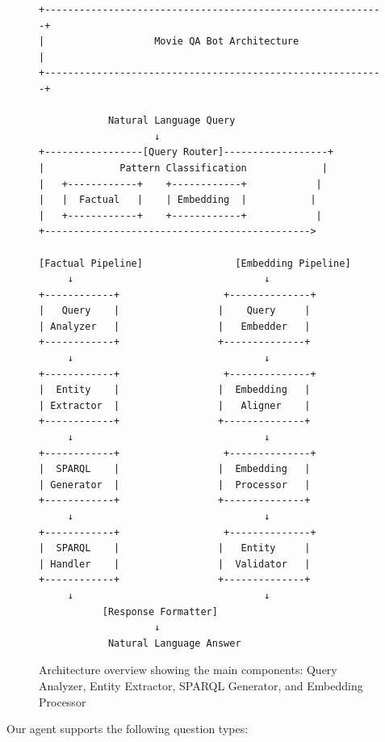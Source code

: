 \documentclass{article}
\begin{document}
\begin{figure}[h]
\centering
\begin{verbatim}
+-----------------------------------------------------------+
|                   Movie QA Bot Architecture                  |
+-----------------------------------------------------------+

            Natural Language Query
                    ↓
+-----------------[Query Router]------------------+
|             Pattern Classification             |
|   +------------+    +------------+            |
|   |  Factual   |    | Embedding  |           |
|   +------------+    +------------+            |
+---------------------------------------------->

[Factual Pipeline]                [Embedding Pipeline]
     ↓                                 ↓
+------------+                  +--------------+
|   Query    |                 |    Query     |
| Analyzer   |                 |   Embedder   |
+------------+                 +--------------+
     ↓                                 ↓
+------------+                  +--------------+
|  Entity    |                 |  Embedding   |
| Extractor  |                 |   Aligner    |
+------------+                 +--------------+
     ↓                                 ↓
+------------+                  +--------------+
|  SPARQL    |                 |  Embedding   |
| Generator  |                 |  Processor   |
+------------+                 +--------------+
     ↓                                 ↓
+------------+                  +--------------+
|  SPARQL    |                 |   Entity     |
| Handler    |                 |  Validator   |
+------------+                 +--------------+
     ↓                                 ↓
           [Response Formatter]
                    ↓
            Natural Language Answer
\end{verbatim}
\caption{Architecture overview showing the main components: Query Analyzer, Entity Extractor, SPARQL Generator, and Embedding Processor}
\label{fig:architecture}
\end{figure}

Our agent supports the following question types:
\end{document}
